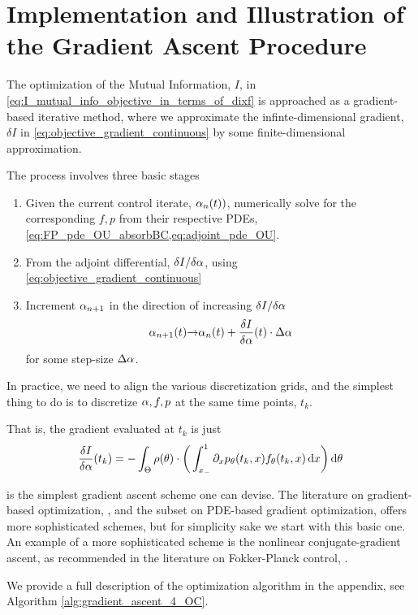 \section{Implementation and Illustration of the Gradient Ascent Procedure}
\label{sec:gradient_ascent}
The optimization of the Mutual Information, $I$, in
\cref{eq:I_mutual_info_objective_in_terms_of_dixf} is approached as a gradient-based iterative method, where we approximate the
infinte-dimensional gradient, $\delta I$ in
\cref{eq:objective_gradient_continuous} by some finite-dimensional
approximation. 

The process involves three basic stages
\begin{enumerate}
  \item Given the current control iterate, $\alpha_n(t))$, numerically solve for the
  corresponding $f,p$ from their respective PDEs,
  \cref{eq:FP_pde_OU_absorbBC,eq:adjoint_pde_OU}.
  \item From the adjoint differential,
  $\delta I / \delta \alpha$, using \cref{eq:objective_gradient_continuous}
  \item Increment $\alpha_{n+1}$ in the direction of increasing $\delta I / \delta
  \alpha$
  \begin{equation}
\alpha_{n+1}(t) {\rightarrow} \alpha_n(t) + \frac {\delta I }{\delta \alpha} (t) \cdot \Delta \alpha
\label{eq:simple_gradient_ascent_increment}
\end{equation}
for some step-size $\Delta \alpha$.
\end{enumerate}

In practice, we need to align the various discretization grids, and the simplest
thing to do is to discretize $\alpha,f,p$ at the same time points, $t_k$.

That is, the gradient evaluated at $t_k$ is just $$ 
\frac {\delta I }{\delta \alpha}(t_k) =   
	-\int_\Theta  \rho({ \theta}) \cdot \bigg(  
	\int_{ x_{-} }^{1} {\partial}_x p_{ \theta}(t_k,x) f_{ \theta}(t_k,x) \, \mathrm{d} x    
	    \bigg) \, \mathrm{d} { \theta}
$$

 is the simplest gradient ascent
scheme one can devise. The literature on gradient-based optimization,
\cite{Nocedal1999}, and the subset on PDE-based gradient optimization,
\cite{Borzi2012} offers more sophisticated schemes, but for simplicity
sake we start with this basic one. An example of a more sophisticated scheme
is the nonlinear conjugate-gradient ascent, as recommended in the literature on
Fokker-Planck control, \cite{Annunziato2013}.
 
We provide a full description of the optimization algorithm in the appendix, see
Algorithm \ref{alg:gradient_ascent_4_OC}.

